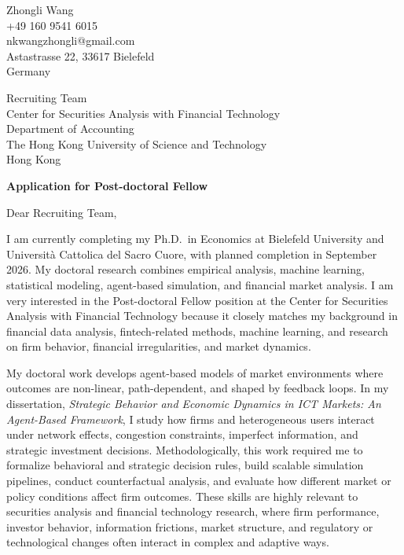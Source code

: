\documentclass[11pt]{article}
\begin{document}
\begin{flushright}
Zhongli Wang \\
+49 160 9541 6015 \\
nkwangzhongli@gmail.com \\
Astastrasse 22, 33617 Bielefeld\\ Germany \\
\end{flushright}

\vspace{0.1cm}

\noindent
Recruiting Team \\
Center for Securities Analysis with Financial Technology \\
Department of Accounting \\
The Hong Kong University of Science and Technology \\
Hong Kong \\

\vspace{0.1cm}

\noindent
\textbf{Application for Post-doctoral Fellow} \\

\vspace{0.05cm}

\noindent Dear Recruiting Team,

I am currently completing my Ph.D.\ in Economics at Bielefeld University and Universit\`a Cattolica del Sacro Cuore, with planned completion in September 2026. My doctoral research combines empirical analysis, machine learning, statistical modeling, agent-based simulation, and financial market analysis. I am very interested in the Post-doctoral Fellow position at the Center for Securities Analysis with Financial Technology because it closely matches my background in financial data analysis, fintech-related methods, machine learning, and research on firm behavior, financial irregularities, and market dynamics.

My doctoral work develops agent-based models of market environments where outcomes are non-linear, path-dependent, and shaped by feedback loops. In my dissertation, \emph{Strategic Behavior and Economic Dynamics in ICT Markets: An Agent-Based Framework}, I study how firms and heterogeneous users interact under network effects, congestion constraints, imperfect information, and strategic investment decisions. Methodologically, this work required me to formalize behavioral and strategic decision rules, build scalable simulation pipelines, conduct counterfactual analysis, and evaluate how different market or policy conditions affect firm outcomes. These skills are highly relevant to securities analysis and financial technology research, where firm performance, investor behavior, information frictions, market structure, and regulatory or technological changes often interact in complex and adaptive ways.
\end{document}
